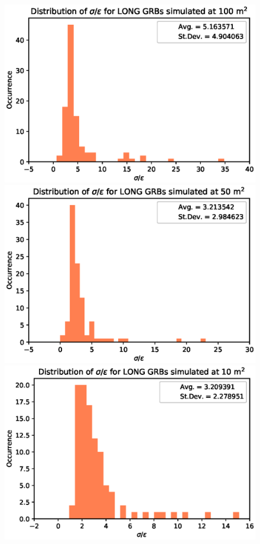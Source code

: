 \documentclass[]{spie}  %
\begin{document}
\begin{figure}[h!]
\centering
\includegraphics[scale=0.5,angle=0]{fig/LONG/ratio_distrib_100.eps}
\includegraphics[scale=0.5,angle=0]{fig/LONG/ratio_distrib_50.eps}\\
\includegraphics[scale=0.5,angle=0]{fig/LONG/ratio_distrib_10.eps}

\end{figure}
\end{document}
